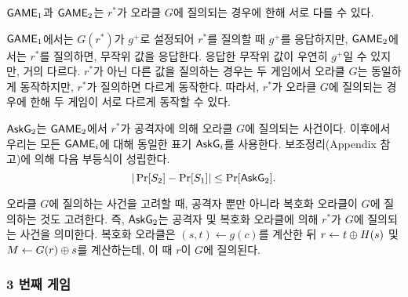 $\textsf{GAME}_1$과 $\textsf{GAME}_2$는 $r^*$가 오라클 $G$에 질의되는 경우에 한해 서로 다를 수
있다. 

\begin{memo}
	$\textsf{GAME}_1$에서는 $G(r^*)$가 $g^+$로 설정되어 $r^*$를 질의할 때 $g^+$를
	응답하지만, $\textsf{GAME}_2$에서는 $r^*$를 질의하면, 무작위 값을 응답한다. 응답한
	무작위 값이 우연히 $g^+$일 수 있지만, 거의 다르다. $r^*$가 아닌 다른 값을
	질의하는 경우는 두 게임에서 오라클 $G$는 동일하게 동작하지만, $r^*$가
	질의하면 다르게 동작한다. 따라서, $r^*$가 오라클 $G$에 질의되는 경우에 한해
	두 게임이 서로 다르게 동작할 수 있다.
\end{memo}

$\textsf{AskG}_2$는 $\textsf{GAME}_2$에서 $r^*$가 공격자에 의해 오라클 $G$에 질의되는 사건이다.
이후에서 우리는 모든 $\textsf{GAME}_i$에 대해 동일한 표기 $\textsf{AskG}_i$를 사용한다.
보조정리(Appendix 참고)에 의해 다음 부등식이 성립한다.
$$
	|\Pr[S_2] - \Pr[S_1]| \leq \Pr[\textsf{AskG}_2].
$$

\begin{memo}
	오라클 $G$에 질의하는 사건을 고려할 때, 공격자 뿐만 아니라 복호화 오라클이
	$G$에 질의하는 것도 고려한다. 즉, $\textsf{AskG}_2$는 공격자 및 복호화 오라클에 의해
	$r^*$가 $G$에 질의되는 사건을 의미한다. 복호화 오라클은 $(s, t) \gets
	g(c)$를 계산한 뒤 $r \gets t \oplus H(s)$ 및 $M \gets G(r) \oplus s$를
	계산하는데, 이 때 $r$이 $G$에 질의된다.
\end{memo}

\newpage
\subsubsection{3 번째 게임}

